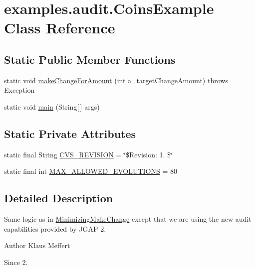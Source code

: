 \hypertarget{classexamples_1_1audit_1_1_coins_example}{\section{examples.\-audit.\-Coins\-Example Class Reference}
\label{classexamples_1_1audit_1_1_coins_example}
}
\subsection*{Static Public Member Functions}
\begin{DoxyCompactItemize}
\item 
static void \hyperlink{classexamples_1_1audit_1_1_coins_example_ac0a78806e49f802c46d856b1b666d815}{make\-Change\-For\-Amount} (int a\-\_\-target\-Change\-Amount)  throws Exception 
\item 
static void \hyperlink{classexamples_1_1audit_1_1_coins_example_a94b6f82db53b500543e3a6004485b8ae}{main} (String\mbox{[}$\,$\mbox{]} args)
\end{DoxyCompactItemize}
\subsection*{Static Private Attributes}
\begin{DoxyCompactItemize}
\item 
static final String \hyperlink{classexamples_1_1audit_1_1_coins_example_aa8c485cb7545c44bcea25462778a9a7f}{C\-V\-S\-\_\-\-R\-E\-V\-I\-S\-I\-O\-N} = \char`\"{}\$Revision\-: 1. \$\char`\"{}
\item 
static final int \hyperlink{classexamples_1_1audit_1_1_coins_example_a2dc1f51908580ca9a6f693a7cfb99b10}{M\-A\-X\-\_\-\-A\-L\-L\-O\-W\-E\-D\-\_\-\-E\-V\-O\-L\-U\-T\-I\-O\-N\-S} = 80
\end{DoxyCompactItemize}


\subsection{Detailed Description}
Same logic as in \hyperlink{classexamples_1_1_minimizing_make_change}{Minimizing\-Make\-Change} except that we are using the new audit capabilities provided by J\-G\-A\-P 2.

\begin{DoxyAuthor}{Author}
Klaus Meffert 
\end{DoxyAuthor}
\begin{DoxySince}{Since}
2. 
\end{DoxySince}



